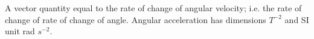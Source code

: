 A vector quantity equal to the rate of change of angular velocity;
i.e. the rate of change of rate of change of angle.
Angular acceleration has dimensions $T^{-2}$  and SI unit rad $s^{-2}.$